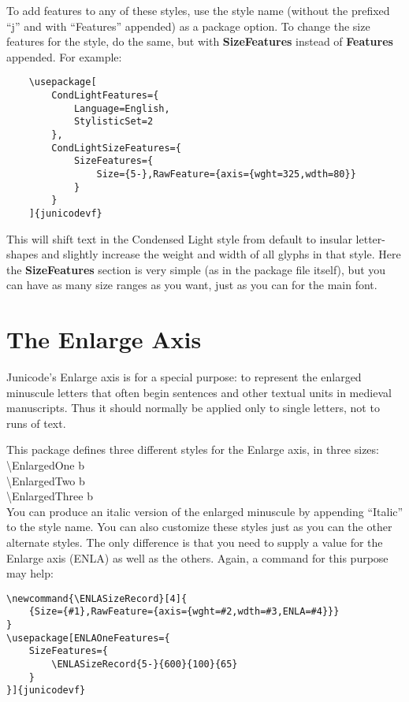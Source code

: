 \documentclass[12pt]{article}
\begin{document}
To add features to any of these styles, use the style name
(without the prefixed “j” and with “Features” appended)
as a package option. To change the size features for the style,
do the same, but with \textbf{SizeFeatures} instead of \textbf{Features}
appended. For example:

\footnotesize
\begin{verbatim}
    \usepackage[
        CondLightFeatures={
            Language=English,
            StylisticSet=2
        },
        CondLightSizeFeatures={
            SizeFeatures={
                Size={5-},RawFeature={axis={wght=325,wdth=80}}
            }
        }
    ]{junicodevf}
\end{verbatim}
\normalsize

\noindent This will shift text in the Condensed Light style from default to insular
letter-shapes and slightly increase the weight and width of all glyphs in that style.
Here the \textbf{SizeFeatures} section is very simple (as in the package file itself),
but you can have as many size ranges as you want, just as you can for the main font.

\section{The Enlarge Axis}

Junicode's Enlarge axis is for a special purpose: to represent the enlarged
minuscule letters that often begin sentences and other textual units in medieval manuscripts.
Thus it should normally be applied only to single letters, not to runs of text.

This package defines three different styles for the Enlarge axis, in three sizes:\\[0.5ex]

\noindent\textbackslash EnlargedOne {\EnlargedOne b}\\
\textbackslash EnlargedTwo {\EnlargedTwo b}\\
\textbackslash EnlargedThree {\EnlargedThree b}\\[0.5ex]

\noindent You can produce an italic version of the enlarged minuscule by appending “Italic” to
the style name. You can also customize these styles just as you can the other alternate
styles. The only difference is that you need to supply a value for the Enlarge axis (ENLA)
as well as the others. Again, a command for this purpose may help:

\footnotesize
\begin{verbatim}
\newcommand{\ENLASizeRecord}[4]{
    {Size={#1},RawFeature={axis={wght=#2,wdth=#3,ENLA=#4}}}
}
\usepackage[ENLAOneFeatures={
    SizeFeatures={
        \ENLASizeRecord{5-}{600}{100}{65}
    }
}]{junicodevf}
\end{verbatim}
\normalsize
\end{document}
